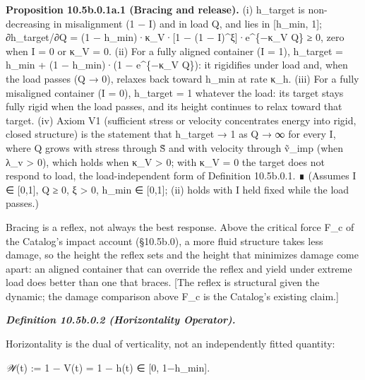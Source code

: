 \documentclass[
]{article}
\begin{document}
\textbf{Proposition 10.5b.0.1a.1 (Bracing and release).} (i) h\_target
is non-decreasing in misalignment (1 − I) and in load Q, and lies in
{[}h\_min, 1{]}; ∂h\_target/∂Q = (1 − h\_min)·κ\_V·{[}1 − (1 −
I)\^{}ξ{]}·e\^{}\{−κ\_V Q\} ≥ 0, zero when I = 0 or κ\_V = 0. (ii) For a
fully aligned container (I = 1), h\_target = h\_min + (1 − h\_min)·(1 −
e\^{}\{−κ\_V Q\}): it rigidifies under load and, when the load passes (Q
→ 0), relaxes back toward h\_min at rate κ\_h. (iii) For a fully
misaligned container (I = 0), h\_target = 1 whatever the load: its
target stays fully rigid when the load passes, and its height continues
to relax toward that target. (iv) Axiom V1 (sufficient stress or
velocity concentrates energy into rigid, closed structure) is the
statement that h\_target → 1 as Q → ∞ for every I, where Q grows with
stress through S̃ and with velocity through ṽ\_imp (when λ\_v
\textgreater{} 0), which holds when κ\_V \textgreater{} 0; with κ\_V = 0
the target does not respond to load, the load-independent form of
Definition 10.5b.0.1. ∎ (Assumes I ∈ {[}0,1{]}, Q ≥ 0, ξ \textgreater{}
0, h\_min ∈ {[}0,1{]}; (ii) holds with I held fixed while the load
passes.)

Bracing is a reflex, not always the best response. Above the critical
force F\_c of the Catalog's impact account (§10.5b.0), a more fluid
structure takes less damage, so the height the reflex sets and the
height that minimizes damage come apart: an aligned container that can
override the reflex and yield under extreme load does better than one
that braces. {[}The reflex is structural given the dynamic; the damage
comparison above F\_c is the Catalog's existing claim.{]}

\emph{\textbf{Definition 10.5b.0.2 (Horizontality Operator).}}

Horizontality is the dual of verticality, not an independently fitted
quantity:

\emph{𝒲}(t) := 1 − V(t) = 1 − h(t) ∈ {[}0, 1−h\_min{]}.
\end{document}
